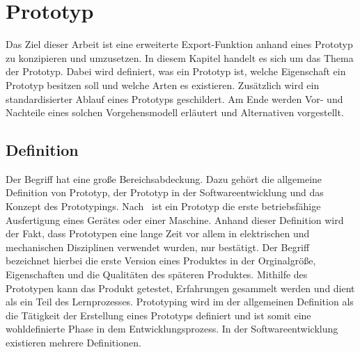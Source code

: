 \chapter{Prototyp} \label{prototyp}
Das Ziel dieser Arbeit ist eine erweiterte Export-Funktion anhand eines Prototyp zu konzipieren und umzusetzen. In diesem Kapitel handelt es sich um das Thema der Prototyp. Dabei wird definiert, was ein Prototyp ist, welche Eigenschaft ein Prototyp besitzen soll und welche Arten es existieren. Zusätzlich wird ein standardisierter Ablauf eines Prototyps geschildert. Am Ende werden Vor- und Nachteile eines solchen Vorgehensmodell erläutert und Alternativen vorgestellt.

\section{Definition} \label{prot:Defintion}
Der Begriff  hat eine große Bereichsabdeckung. Dazu gehört die allgemeine Definition von Prototyp, der Prototyp in der Softwareentwicklung und das Konzept des Prototypings. 
Nach \citeauthor{Brockhaus.1992}\,\cite{Brockhaus.1992} ist ein Prototyp die erste betriebsfähige Ausfertigung eines Gerätes oder einer Maschine. Anhand dieser Definition wird der Fakt, dass Prototypen eine lange Zeit vor allem in elektrischen und mechanischen Disziplinen verwendet wurden, nur bestätigt. Der Begriff bezeichnet hierbei die erste Version eines Produktes in der Orginalgröße, Eigenschaften und die Qualitäten des späteren Produktes. Mithilfe des Prototypen kann das Produkt getestet, Erfahrungen gesammelt werden und dient als ein Teil des Lernprozesses. Prototyping wird im der allgemeinen Definition als die Tätigkeit der Erstellung eines Prototyps definiert und ist somit eine wohldefinierte Phase in dem Entwicklungsprozess. 
In der Softwareentwicklung existieren mehrere Definitionen. 


